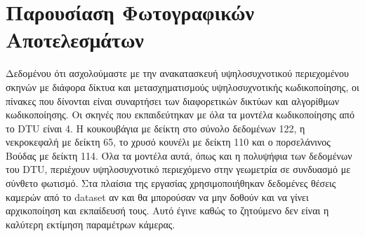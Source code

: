 \section{Παρουσίαση Φωτογραφικών Αποτελεσμάτων}
    Δεδομένου ότι ασχολούμαστε με την  ανακατασκευή υψηλοσυχνοτικού περιεχομένου σκηνών με διάφορα δίκτυα και μετασχηματισμούς υψηλοσυχνοτικής κωδικοποίησης, οι πίνακες που δίνονται είναι συναρτήσει των διαφορετικών δικτύων και αλγορίθμων κωδικοποίησης. Οι σκηνές που εκπαιδεύτηκαν με όλα τα μοντέλα κωδικοποίησης από το DTU είναι 4. Η κουκουβάγια με δείκτη στο σύνολο δεδομένων 122, η νεκροκεφαλή με δείκτη 65, το χρυσό κουνέλι με δείκτη 110 και ο πορσελάνινος Βούδας με δείκτη 114. Όλα τα μοντέλα αυτά, όπως και η πολυψήφια των δεδομένων του DTU, περιέχουν υψηλοσυχνοτικό περιεχόμενο στην γεωμετρία σε συνδυασμό με σύνθετο φωτισμό. Στα πλαίσια της εργασίας χρησιμοποιήθηκαν δεδομένες θέσεις καμερών από το dataset αν και θα μπορούσαν να μην δοθούν και να γίνει αρχικοποίηση \cite{jiang2013global} και εκπαίδευσή τους. Αυτό έγινε καθώς το ζητούμενο δεν είναι η καλύτερη εκτίμηση παραμέτρων κάμερας.
    \clearpage
